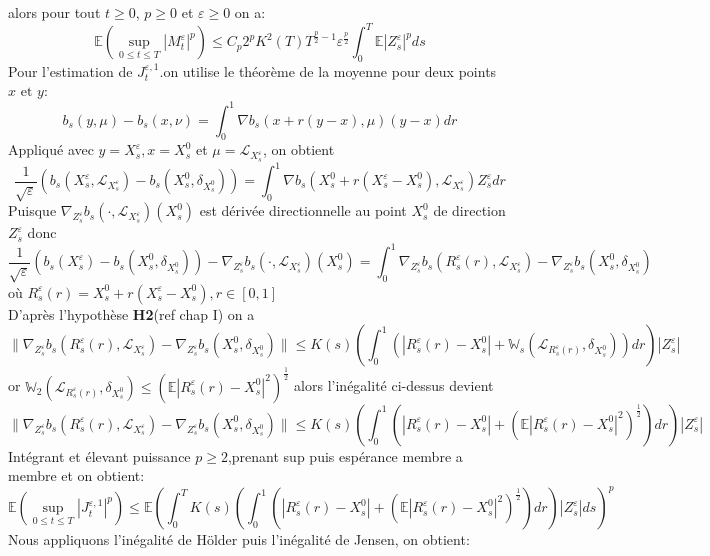 \documentclass[12pt,a4paper,twoside,fleqn]{book}%
\theoremstyle{definition}
\theoremstyle{lemme}
\numberwithin{equation}{section}
\begin{document}
alors pour tout $t\geq0$, $p\geq0$ et $\varepsilon\geq0$ on a:
\begin{equation}\label{eq:2.2.33}
	\mathbb{E}\left(\sup_{0\leq t \leq T}|M_t^\varepsilon|^p\right)\leq C_p2^pK^2(T)T^{\frac{p}{2}-1}\varepsilon^{\frac{p}{2}}\int_{0}^{T}\mathbb{E}|Z_s^\varepsilon|^pds
\end{equation}
Pour l'estimation de $J_t^{\varepsilon,1}$.on utilise le théorème de la moyenne pour deux points $x\text{ et }y$:
\[
b_s(y,\mu)-b_s(x,\nu)=\int_{0}^{1}\nabla b_s(x+r(y-x),\mu)(y-x)dr
\]Appliqué avec $y=X_s^\varepsilon,x=X_s^0$ et $\mu=\mathcal{L}_{X_s^\varepsilon}$, on obtient
\[
\frac{1}{\sqrt{\varepsilon}}\left(b_s(X_s^\varepsilon,\mathcal{L}_{X_s^\varepsilon})-b_s(X_s^0,\delta_{X_s^0})\right)=\int_{0}^{1}\nabla b_s(X_s^0+r(X_s^\varepsilon-X_s^0),\mathcal{L}_{X_s^\varepsilon})Z_s^\varepsilon dr
\]
Puisque $\nabla_{Z_s^\varepsilon}b_s(\cdot, \mathcal{L}_{X_s^\varepsilon})(X_s^0)$ est dérivée directionnelle au point $X_s^0$ de direction $Z_s^\varepsilon$ donc
\[
\frac{1}{\sqrt{\varepsilon}}\left(b_s(X_s^\varepsilon)-b_s(X_s^0,\delta_{X_s^0})\right)-\nabla_{Z_s^\varepsilon}b_s(\cdot,\mathcal{L}_{X_s^\varepsilon})(X_s^0)=\int_{0}^{1}\nabla_{Z_s^\varepsilon} b_s(R_s^\varepsilon(r),\mathcal{L}_{X_s^\varepsilon}) - \nabla_{Z_s^\varepsilon} b_s(X_s^0,\delta_{X_s^0})\]
où $R_s^\varepsilon(r) = X_s^0+r(X_s^\varepsilon-X_s^0),r\in[0,1]$\\
D'après l'hypothèse \textbf{H2}(ref chap I) on a
\[
\|\nabla_{Z_s^\varepsilon} b_s(R_s^\varepsilon(r),\mathcal{L}_{X_s^\varepsilon}) - \nabla_{Z_s^\varepsilon} b_s(X_s^0,\delta_{X_s^0})\|\leq K(s)\left(\int_{0}^{1}\left(|R_s^\varepsilon(r)-X_s^0| +\mathbb{W}_s(\mathcal{L}_{R_s^\varepsilon(r)},\delta_{X_s^0})\right)dr\right)|Z_s^\varepsilon|
\]
or $\mathbb{W}_2(\mathcal{L}_{R_s^\varepsilon(r)},\delta_{X_s^0})\leq\left(\mathbb{E}|R_s^\varepsilon(r)-X_s^0|^2\right)^{\frac{1}{2}}$ alors l'inégalité ci-dessus devient
\[
\|\nabla_{Z_s^\varepsilon} b_s(R_s^\varepsilon(r),\mathcal{L}_{X_s^\varepsilon}) - \nabla_{Z_s^\varepsilon} b_s(X_s^0,\delta_{X_s^0})\|\leq K(s)\left(\int_{0}^{1}\left(|R_s^\varepsilon(r)-X_s^0|+ \left(\mathbb{E}|R_s^\varepsilon(r)-X_s^0|^2\right)^{\frac{1}{2}}\right)dr\right)|Z_s^\varepsilon|
\]
Intégrant et élevant puissance $p\geq2$,prenant sup puis espérance membre a membre et on obtient:
\[
\mathbb{E}\left(\sup_{0\leq t \leq T}|J_t^{\varepsilon,1}|^p\right)\leq \mathbb{E}\left(\int_{0}^{T} K(s)\left(\int_{0}^{1}\left(|R_s^\varepsilon(r)-X_s^0|+ \left(\mathbb{E}|R_s^\varepsilon(r)-X_s^0|^2\right)^{\frac{1}{2}}\right)dr\right)|Z_s^\varepsilon|ds\right)^p
\]Nous appliquons l'inégalité de Hölder puis l'inégalité de Jensen, on obtient:
\end{document}
